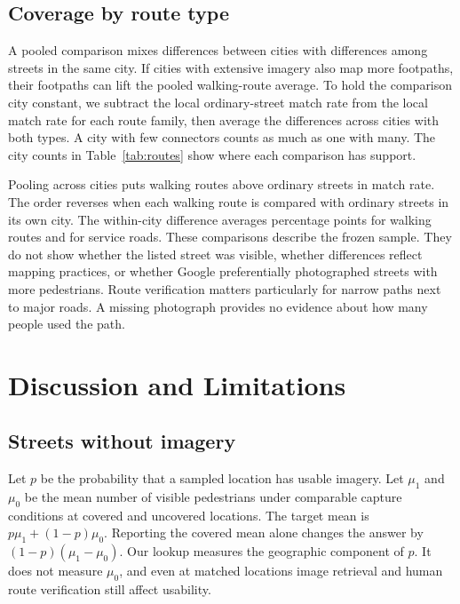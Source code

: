 \documentclass[11pt]{article}
\begin{document}
\subsection{Coverage by route type}
A pooled comparison mixes differences between cities with differences among streets in the same city. If cities with extensive imagery also map more footpaths, their footpaths can lift the pooled walking-route average. To hold the comparison city constant, we subtract the local ordinary-street match rate from the local match rate for each route family, then average the differences across cities with both types. A city with few connectors counts as much as one with many. The city counts in Table~\ref{tab:routes} show where each comparison has support.
\begin{table}[ht]\centering\small
\caption{Availability by mapped route family in all study sites. The last column gives the mean within-city difference from ordinary streets in percentage points.}\label{tab:routes}
\end{table}

Pooling across cities puts walking routes above ordinary streets in match rate. The order reverses when each walking route is compared with ordinary streets in its own city. The within-city difference averages \WalkGap{} percentage points for walking routes and \ServiceGap{} for service roads. These comparisons describe the frozen sample. They do not show whether the listed street was visible, whether differences reflect mapping practices, or whether Google preferentially photographed streets with more pedestrians. Route verification matters particularly for narrow paths next to major roads. A missing photograph provides no evidence about how many people used the path.

\section{Discussion and Limitations}
\subsection{Streets without imagery}
Let $p$ be the probability that a sampled location has usable imagery. Let $\mu_1$ and $\mu_0$ be the mean number of visible pedestrians under comparable capture conditions at covered and uncovered locations. The target mean is $p\mu_1+(1-p)\mu_0$. Reporting the covered mean alone changes the answer by $(1-p)(\mu_1-\mu_0)$. Our lookup measures the geographic component of $p$. It does not measure $\mu_0$, and even at matched locations image retrieval and human route verification still affect usability.
\end{document}
